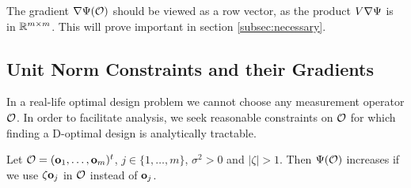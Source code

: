 
The gradient $\nabla \Psi(\mathcal{O})$ should be viewed as a row vector,
as the product $V \nabla \Psi$ is in $\mathbb{R}^{m \times m}$. This will
prove important in section \ref{subsec:necessary}.

\subsection{Unit Norm Constraints and their Gradients}\label{subsec:unit norm}
In a real-life optimal design problem we cannot choose any measurement
operator $\mathcal{O}$. In order to facilitate analysis, we seek reasonable
constraints on $\mathcal{O}$ for which finding a D-optimal design is
analytically tractable. %

\begin{proposition}\label{prop:bigger better}
  Let $\mathcal{O} = (\mathbf{o}_1,\dots,\mathbf{o}_m)^t$, $j \in \{1,\dots,m\}$,
  $\sigma^2 > 0$ and $|\zeta| > 1$. Then $\Psi(\mathcal{O})$ increases if we
  use $\zeta \mathbf{o}_j$ in $\mathcal{O}$ instead of $\mathbf{o}_j$.
\end{proposition}

